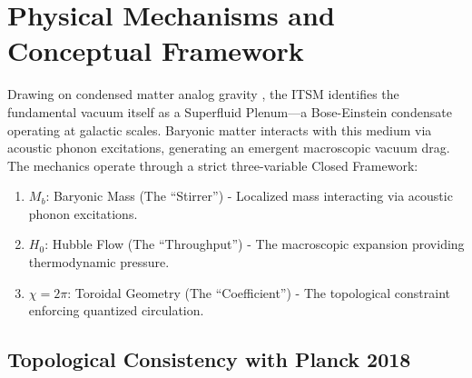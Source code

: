 \documentclass[aps,prd,10pt,twocolumn,superscriptaddress,nofootinbib,floatfix]{revtex4-2}
\begin{document}
\section{Physical Mechanisms and Conceptual Framework}
Drawing on condensed matter analog gravity \cite{barcelo, volovik}, the ITSM identifies the fundamental vacuum itself as a Superfluid Plenum---a Bose-Einstein condensate operating at galactic scales. Baryonic matter interacts with this medium via acoustic phonon excitations, generating an emergent macroscopic vacuum drag. The mechanics operate through a strict three-variable Closed Framework:
\begin{enumerate}
    \item $M_b$: Baryonic Mass (The ``Stirrer'') - Localized mass interacting via acoustic phonon excitations.
    \item $H_0$: Hubble Flow (The ``Throughput'') - The macroscopic expansion providing thermodynamic pressure.
    \item $\chi=2\pi$: Toroidal Geometry (The ``Coefficient'') - The topological constraint enforcing quantized circulation.
\end{enumerate}


\subsection{Topological Consistency with Planck 2018}
\end{document}
